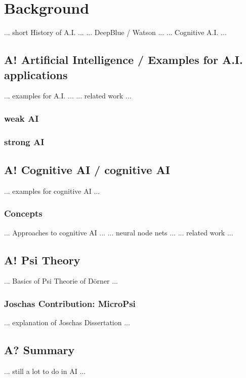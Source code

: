 \chapter{Background}

... short History of A.I. ...
... DeepBlue / Watson ...
... Cognitive A.I. ...

\section{A! Artificial Intelligence / Examples for A.I. applications}
... examples for A.I. ...
... related work ...

\subsection{weak AI}

\subsection{strong AI}

\section{A! Cognitive AI / cognitive AI}
... examples for cognitive AI ...

\subsection{Concepts}

... Approaches to cognitive AI ...
... neural node nets ...
... related work ...

\section{A! Psi Theory}
... Basics of Psi Theorie of Dörner ...

\subsection{Joschas Contribution: MicroPsi}
... explanation of Joschas Dissertation ...

\section{A? Summary}
... still a lot to do in AI ...